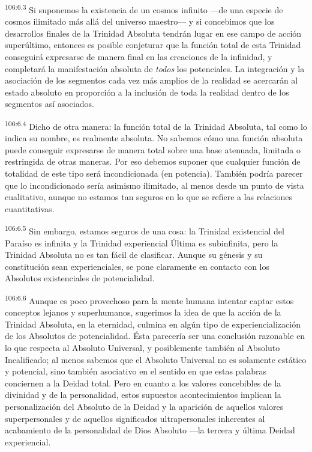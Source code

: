 \documentclass[twoside, 11pt]{book}
\begin{document}
\par
\textsuperscript{106:6.3} Si suponemos la existencia de un cosmos infinito ---de una especie de cosmos ilimitado más allá del universo maestro--- y si concebimos que los desarrollos finales de la Trinidad Absoluta tendrán lugar en ese campo de acción superúltimo, entonces es posible conjeturar que la función total de esta Trinidad conseguirá expresarse de manera final en las creaciones de la infinidad, y completará la manifestación absoluta de \textit{todos} los potenciales. La integración y la asociación de los segmentos cada vez más amplios de la realidad se acercarán al estado absoluto en proporción a la inclusión de toda la realidad dentro de los segmentos así asociados.

\par
\textsuperscript{106:6.4} Dicho de otra manera: la función total de la Trinidad Absoluta, tal como lo indica su nombre, es realmente absoluta. No sabemos cómo una función absoluta puede conseguir expresarse de manera total sobre una base atenuada, limitada o restringida de otras maneras. Por eso debemos suponer que cualquier función de totalidad de este tipo será incondicionada (en potencia). También podría parecer que lo incondicionado sería asimismo ilimitado, al menos desde un punto de vista cualitativo, aunque no estamos tan seguros en lo que se refiere a las relaciones cuantitativas.

\par
\textsuperscript{106:6.5} Sin embargo, estamos seguros de una cosa: la Trinidad existencial del Paraíso es infinita y la Trinidad experiencial Última es subinfinita, pero la Trinidad Absoluta no es tan fácil de clasificar. Aunque su génesis y su constitución sean experienciales, se pone claramente en contacto con los Absolutos existenciales de potencialidad.

\par
\textsuperscript{106:6.6} Aunque es poco provechoso para la mente humana intentar captar estos conceptos lejanos y superhumanos, sugerimos la idea de que la acción de la Trinidad Absoluta, en la eternidad, culmina en algún tipo de experiencialización de los Absolutos de potencialidad. Ésta parecería ser una conclusión razonable en lo que respecta al Absoluto Universal, y posiblemente también al Absoluto Incalificado; al menos sabemos que el Absoluto Universal no es solamente estático y potencial, sino también asociativo en el sentido en que estas palabras conciernen a la Deidad total. Pero en cuanto a los valores concebibles de la divinidad y de la personalidad, estos supuestos acontecimientos implican la personalización del Absoluto de la Deidad y la aparición de aquellos valores superpersonales y de aquellos significados ultrapersonales inherentes al acabamiento de la personalidad de Dios Absoluto ---la tercera y última Deidad experiencial.
\end{document}
